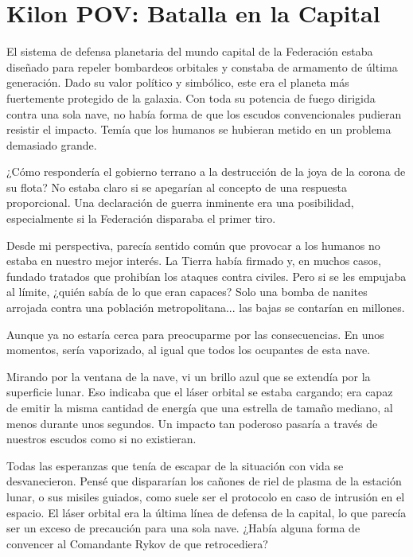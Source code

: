 \documentclass[spanish,12pt,a4paper,oneside,titlepage]{book}
\begin{document}
    \chapter{Kilon POV: Batalla en la Capital}

    El sistema de defensa planetaria del mundo capital de la Federación estaba diseñado para repeler bombardeos orbitales y constaba de armamento de última generación. Dado su valor político y simbólico, este era el planeta más fuertemente protegido de la galaxia. Con toda su potencia de fuego dirigida contra una sola nave, no había forma de que los escudos convencionales pudieran resistir el impacto. Temía que los humanos se hubieran metido en un problema demasiado grande.

    ¿Cómo respondería el gobierno terrano a la destrucción de la joya de la corona de su flota? No estaba claro si se apegarían al concepto de una respuesta proporcional. Una declaración de guerra inminente era una posibilidad, especialmente si la Federación disparaba el primer tiro.

    Desde mi perspectiva, parecía sentido común que provocar a los humanos no estaba en nuestro mejor interés. La Tierra había firmado y, en muchos casos, fundado tratados que prohibían los ataques contra civiles. Pero si se les empujaba al límite, ¿quién sabía de lo que eran capaces? Solo una bomba de nanites arrojada contra una población metropolitana... las bajas se contarían en millones.

    Aunque ya no estaría cerca para preocuparme por las consecuencias. En unos momentos, sería vaporizado, al igual que todos los ocupantes de esta nave.

    Mirando por la ventana de la nave, vi un brillo azul que se extendía por la superficie lunar. Eso indicaba que el láser orbital se estaba cargando; era capaz de emitir la misma cantidad de energía que una estrella de tamaño mediano, al menos durante unos segundos. Un impacto tan poderoso pasaría a través de nuestros escudos como si no existieran.

    Todas las esperanzas que tenía de escapar de la situación con vida se desvanecieron. Pensé que dispararían los cañones de riel de plasma de la estación lunar, o sus misiles guiados, como suele ser el protocolo en caso de intrusión en el espacio. El láser orbital era la última línea de defensa de la capital, lo que parecía ser un exceso de precaución para una sola nave. ¿Había alguna forma de convencer al Comandante Rykov de que retrocediera?
\end{document}
